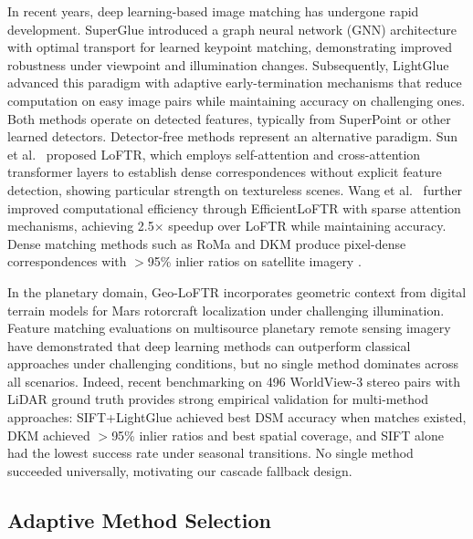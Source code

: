 \documentclass[lettersize,journal]{IEEEtran}
\begin{document}
In recent years, deep learning-based image matching has undergone rapid development. SuperGlue \cite{sarlin2020superglue} introduced a graph neural network (GNN) architecture with optimal transport for learned keypoint matching, demonstrating improved robustness under viewpoint and illumination changes. Subsequently, LightGlue \cite{lindenberger2023lightglue} advanced this paradigm with adaptive early-termination mechanisms that reduce computation on easy image pairs while maintaining accuracy on challenging ones. Both methods operate on detected features, typically from SuperPoint \cite{detone2018superpoint} or other learned detectors. Detector-free methods represent an alternative paradigm. Sun et al.\ \cite{sun2021loftr} proposed LoFTR, which employs self-attention and cross-attention transformer layers to establish dense correspondences without explicit feature detection, showing particular strength on textureless scenes. Wang et al.\ \cite{wang2024efficientloftr} further improved computational efficiency through EfficientLoFTR with sparse attention mechanisms, achieving 2.5$\times$ speedup over LoFTR while maintaining accuracy. Dense matching methods such as RoMa \cite{edstedt2024roma} and DKM \cite{edstedt2023dkm} produce pixel-dense correspondences with $>$95\% inlier ratios on satellite imagery \cite{satellite2024benchmark}.

In the planetary domain, Geo-LoFTR \cite{geoloftr2025} incorporates geometric context from digital terrain models for Mars rotorcraft localization under challenging illumination. Feature matching evaluations on multisource planetary remote sensing imagery \cite{ye2024planetary} have demonstrated that deep learning methods can outperform classical approaches under challenging conditions, but no single method dominates across all scenarios. Indeed, recent benchmarking on 496 WorldView-3 stereo pairs with LiDAR ground truth \cite{satellite2024benchmark} provides strong empirical validation for multi-method approaches: SIFT+LightGlue achieved best DSM accuracy when matches existed, DKM achieved $>$95\% inlier ratios and best spatial coverage, and SIFT alone had the lowest success rate under seasonal transitions. No single method succeeded universally, motivating our cascade fallback design.

\subsection{Adaptive Method Selection}
\end{document}
